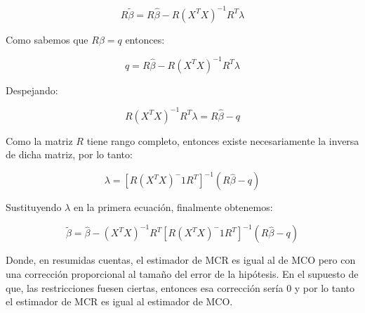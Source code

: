 \documentclass[
]{book}
\begin{document}
\[
R\widetilde{\beta} = R\hat{\beta} - R(X^TX)^{-1}R^T\lambda
\]

Como sabemos que \(R\beta = q\) entonces:

\[
q = R\hat{\beta} - R(X^TX)^{-1}R^T\lambda
\]

Despejando:

\[
R(X^TX)^{-1}R^T\lambda = R\hat{\beta} - q 
\]

Como la matriz \(R\) tiene rango completo, entonces existe necesariamente la inversa de dicha matriz, por lo tanto:

\[
\lambda = [R(X^TX)^-1R^T]^{-1}(R\hat{\beta}-q)
\]

Sustituyendo \(\lambda\) en la primera ecuación, finalmente obtenemos:

\[
\widetilde{\beta} = \hat{\beta} - (X^TX)^{-1}R^T[R(X^TX)^-1R^T]^{-1}(R\hat{\beta}-q)
\]

Donde, en resumidas cuentas, el estimador de MCR es igual al de MCO pero con una corrección proporcional al tamaño del error de la hipótesis. En el supuesto de que, las restricciones fuesen ciertas, entonces esa corrección sería 0 y por lo tanto el estimador de MCR es igual al estimador de MCO.
\end{document}
